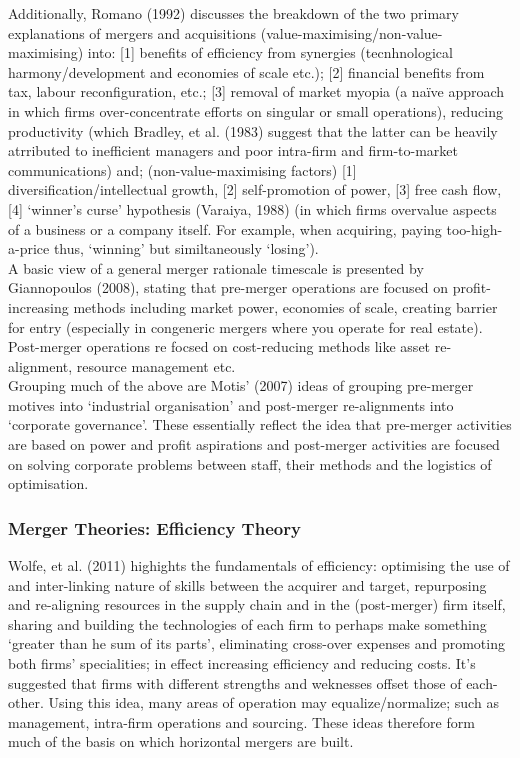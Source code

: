 \documentclass[11pt, english]{article}
\begin{document}
	Additionally, Romano (1992) discusses the breakdown of the two primary explanations of mergers and acquisitions (value-maximising/non-value-maximising) into: [1] benefits of efficiency from synergies (tecnhnological harmony/development and economies of scale etc.); [2] financial benefits from tax, labour reconfiguration, etc.; [3] removal of market myopia (a na\"{i}ve approach in which firms over-concentrate efforts on singular or small operations), reducing productivity (which Bradley, et al. (1983) suggest that the latter can be heavily atrributed to inefficient managers and poor intra-firm and firm-to-market communications) and; (non-value-maximising factors) [1] diversification/intellectual growth, [2] self-promotion of power, [3] free cash flow, [4] `winner's curse' hypothesis (Varaiya, 1988) (in which firms overvalue aspects of a business or a company itself. For example, when acquiring, paying too-high-a-price thus, `winning' but similtaneously `losing').\\
	
	A basic view of a general merger rationale timescale is presented by Giannopoulos (2008), stating that pre-merger operations are focused on profit-increasing methods including market power, economies of scale, creating barrier for entry (especially in congeneric mergers where you operate for real estate). Post-merger operations re focsed on cost-reducing methods like asset re-alignment, resource management etc.\\

	Grouping much of the above are Motis' (2007) ideas of grouping pre-merger motives into `industrial organisation' and post-merger re-alignments into `corporate governance'. These essentially reflect the idea that pre-merger activities are based on power and profit aspirations and post-merger activities are focused on solving corporate problems between staff, their methods and the logistics of optimisation.

		\subsubsection*{Merger Theories: Efficiency Theory}

	Wolfe, et al. (2011) highights the fundamentals of efficiency: optimising the use of and inter-linking nature of skills between the acquirer and target, repurposing and re-aligning resources in the supply chain and in the (post-merger) firm itself, sharing and building the technologies of each firm to perhaps make something `greater than he sum of its parts', eliminating cross-over expenses and promoting both firms' specialities; in effect increasing efficiency and reducing costs. It's suggested that firms with different strengths and weknesses offset those of each-other. Using this idea, many areas of operation may equalize/normalize; such as management, intra-firm operations and sourcing. These ideas therefore form much of the basis on which horizontal mergers are built.
\end{document}
